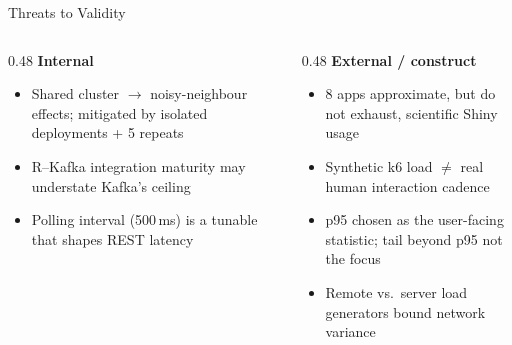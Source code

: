 \documentclass[aspectratio=169]{beamer}
\begin{document}
\begin{frame}{Threats to Validity}

\begin{columns}[T]
\begin{column}{0.48\textwidth}
\textbf{Internal}
\begin{itemize}
    \item Shared cluster $\rightarrow$ noisy-neighbour effects;
          mitigated by isolated deployments + 5 repeats
    \item R--Kafka integration maturity may understate Kafka's ceiling
    \item Polling interval (500\,ms) is a tunable that shapes REST latency
\end{itemize}
\end{column}
\begin{column}{0.48\textwidth}
\textbf{External / construct}
\begin{itemize}
    \item 8 apps approximate, but do not exhaust, scientific Shiny usage
    \item Synthetic k6 load $\neq$ real human interaction cadence
    \item p95 chosen as the user-facing statistic; tail beyond p95 not
          the focus
    \item Remote vs.\ server load generators bound network variance
\end{itemize}
\end{column}
\end{columns}

\end{frame}
\end{document}
